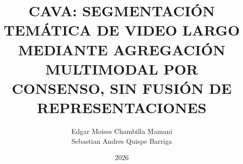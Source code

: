 \documentclass[a4paper,12pt,oneside]{tesisutec}
\begin{document}
\frontmatter


\title{CAVA: SEGMENTACIÓN TEMÁTICA DE VIDEO LARGO MEDIANTE AGREGACIÓN MULTIMODAL POR CONSENSO, SIN FUSIÓN DE REPRESENTACIONES}

\author{Edgar Moises Chambilla Mamani  \\ Sebastian Andres Quispe Barriga } %

\date{2026}

\maketitle






\tableofcontents

\newpage

\listoftables

\newpage

\listoffigures


\mainmatter
\pagestyle{fancy}


 







\renewcommand{\bibname}{\hfill\Large\bf{REFERENCIAS BIBLIOGRÁFICAS}\hfill}




\end{document}
